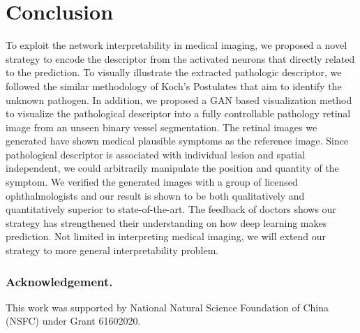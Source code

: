 \documentclass[letterpaper]{article} %
\begin{document}
	\section{Conclusion}
        To exploit the network interpretability in medical imaging, we proposed a novel strategy to encode the descriptor from the activated neurons that directly related to the prediction. To visually illustrate the extracted pathologic descriptor, we followed the similar methodology of Koch's Postulates that aim to identify the unknown pathogen. In addition, we proposed a GAN based visualization method to visualize the pathological descriptor into a fully controllable pathology retinal image from an unseen binary vessel segmentation. The retinal images we generated have shown medical plausible symptoms  as the reference image. Since pathological descriptor is associated with individual lesion and spatial independent, we could arbitrarily manipulate the position and quantity of the symptom. We verified the generated images with  a group of  licensed ophthalmologists and our result is shown to be both qualitatively and quantitatively superior to state-of-the-art.
        The feedback of doctors shows our strategy  has strengthened their understanding on how deep learning makes prediction. Not limited in interpreting medical imaging, we will extend our strategy to more general interpretability problem.












        \subsubsection{Acknowledgement.} This work was supported by National Natural Science Foundation of China (NSFC) under Grant 61602020.
\end{document}
